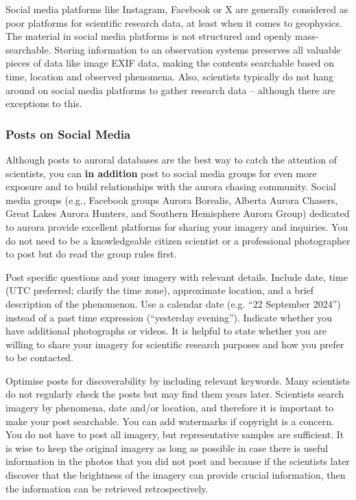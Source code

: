 \documentclass{article}
\begin{document}
Social media platforms like Instagram, Facebook or X are generally considered as poor platforms for scientific research data, at least when it comes to geophysics. The material in social media platforms is not structured and openly mass-searchable. Storing information to an observation systems preserves all valuable pieces of data like image EXIF data, making the contents searchable based on time, location and observed phenomena. Also, scientists typically do not hang around on social media platforms to gather research data -- although there are exceptions to this.

\subsubsection{Posts on Social Media}


Although posts to auroral databases are the best way to catch the attention of scientists, you can \textbf{in addition} post to social media groups for even more exposure and to build relationships with the aurora chasing community.
Social media groups (e.g., Facebook groups Aurora Borealis, Alberta Aurora Chasers, Great Lakes Aurora Hunters, and Southern Hemisphere Aurora Group) dedicated to aurora provide excellent platforms for sharing your imagery and inquiries. You do not need to be a knowledgeable citizen scientist or a professional photographer to post but do read the group rules first.

Post specific questions and your imagery with relevant details. Include date, time (UTC preferred; clarify the time zone), approximate location, and a brief description of the phenomenon. Use a calendar date (e.g. ``22 September 2024'') instead of a past time expression (``yesterday evening''). Indicate whether you have additional photographs or videos. It is helpful to state whether you are willing to share your imagery for scientific research purposes and how you prefer to be contacted. 
 
Optimise posts for discoverability by including relevant keywords. Many scientists do not regularly check the posts but may find them years later. Scientists search imagery by phenomena, date and/or location, and therefore it is important to make your post searchable. You can add watermarks if copyright is a concern. You do not have to post all imagery, but representative samples are sufficient. It is wise to keep the original imagery as long as possible in case there is useful information in the photos that you did not post and because if the scientists later discover that the brightness of the imagery can provide crucial information, then the information can be retrieved retrospectively.
\end{document}
